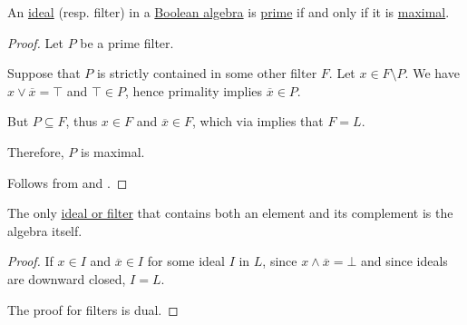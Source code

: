 \begin{proposition}\label{thm:boolean_prime_iff_maximal}
  An  \hyperref[def:lattice_ideal/ideal]{ideal} (resp. filter) in a \hyperref[def:boolean_algebra]{Boolean algebra} is \hyperref[def:lattice_ideal/prime]{prime} if and only if it is \hyperref[def:lattice_ideal/maximal]{maximal}.
\end{proposition}
\begin{proof}
  \SufficiencySubProof Let \( P \) be a prime filter.

  Suppose that \( P \) is strictly contained in some other filter \( F \). Let \( x \in F \setminus P \). We have \( x \vee \overline x = \top \) and \( \top \in P \), hence primality implies \( \overline x \in P \).

  But \( P \subseteq F \), thus \( x \in F \) and \( \overline x \in F \), which via  implies that \( F = L \).

  Therefore, \( P \) is maximal.

  \NecessitySubProof Follows from  and .
\end{proof}

\begin{lemma}\label{thm:improper_boolean_ideal}
  The only \hyperref[def:lattice_ideal/ideal]{ideal or filter} that contains both an element and its complement is the algebra itself.
\end{lemma}
\begin{proof}
  If \( x \in I \) and \( \overline x \in I \) for some ideal \( I \) in \( L \), since \( x \wedge \overline x = \bot \) and since ideals are downward closed, \( I = L \).

  The proof for filters is dual.
\end{proof}

